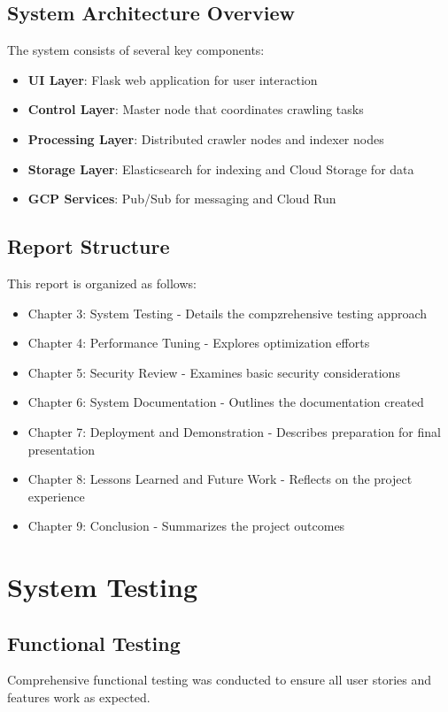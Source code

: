 \documentclass[12pt,a4paper]{report}
\begin{document}
\section{System Architecture Overview}
The system consists of several key components:
\begin{itemize}
    \item \textbf{UI Layer}: Flask web application for user interaction
    \item \textbf{Control Layer}: Master node that coordinates crawling tasks
    \item \textbf{Processing Layer}: Distributed crawler nodes and indexer nodes
    \item \textbf{Storage Layer}: Elasticsearch for indexing and Cloud Storage for data
    \item \textbf{GCP Services}: Pub/Sub for messaging and Cloud Run
\end{itemize}

\section{Report Structure}
This report is organized as follows:
\begin{itemize}
    \item Chapter 3: System Testing - Details the compzrehensive testing approach
    \item Chapter 4: Performance Tuning - Explores optimization efforts
    \item Chapter 5: Security Review - Examines basic security considerations
    \item Chapter 6: System Documentation - Outlines the documentation created
    \item Chapter 7: Deployment and Demonstration - Describes preparation for final presentation
    \item Chapter 8: Lessons Learned and Future Work - Reflects on the project experience
    \item Chapter 9: Conclusion - Summarizes the project outcomes
\end{itemize}

\chapter{System Testing}

\section{Functional Testing}
Comprehensive functional testing was conducted to ensure all user stories and features work as expected.
\end{document}
